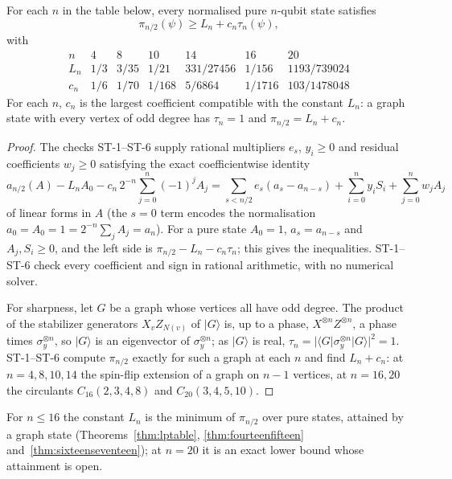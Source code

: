 \begin{theorem}
\label{thm:purity-spinflip-tradeoff}
For each $n$ in the table below, every normalised pure $n$-qubit state satisfies
\[
 \boxed{\qquad
 \pi_{n/2}(\psi)\ge L_n+c_n\tau_n(\psi),\qquad}
\]
with
\[
\begin{array}{c|cccccc}
n&4&8&10&14&16&20\\\hline
L_n&1/3&3/35&1/21&331/27456&1/156&1193/739024\\
c_n&1/6&1/70&1/168&5/6864&1/1716&103/1478048
\end{array}
\]
For each $n$, $c_n$ is the largest coefficient compatible with the constant $L_n$: a graph state with
every vertex of odd degree has $\tau_n=1$ and $\pi_{n/2}=L_n+c_n$.
\end{theorem}
\begin{proof}
The checks ST-1--ST-6 supply rational multipliers $e_s$,
$y_i\ge0$ and residual coefficients $w_j\ge0$ satisfying the exact coefficientwise identity
\begin{equation}\label{eq:tradeoff-dual}
 a_{n/2}(A)-L_nA_0-
 c_n\,2^{-n}\sum_{j=0}^n(-1)^jA_j
 =\sum_{s< n/2}e_s(a_s-a_{n-s})
  +\sum_{i=0}^n y_iS_i+\sum_{j=0}^n w_jA_j
\end{equation}
of linear forms in $A$ (the $s=0$ term encodes the normalisation $a_0=A_0=1=2^{-n}\sum_jA_j=a_n$).
For a pure state $A_0=1$, $a_s=a_{n-s}$ and $A_j,S_i\ge0$, and the left side is
$\pi_{n/2}-L_n-c_n\tau_n$; this gives the inequalities. ST-1--ST-6 check every coefficient and sign in
rational arithmetic, with no numerical solver.

For sharpness, let $G$ be a graph whose vertices all have odd degree. The product of the stabilizer
generators $X_vZ_{N(v)}$ of $|G\rangle$ is, up to a phase, $X^{\otimes n}Z^{\otimes n}$, a phase times
$\sigma_y^{\otimes n}$, so $|G\rangle$ is an eigenvector of $\sigma_y^{\otimes n}$; as $|G\rangle$ is
real, $\tau_n=|\langle G|\sigma_y^{\otimes n}|G\rangle|^2=1$. ST-1--ST-6 compute $\pi_{n/2}$ exactly
for such a graph at each $n$ and find $L_n+c_n$: at $n=4,8,10,14$ the spin-flip extension of a graph on
$n-1$ vertices, at $n=16,20$ the circulants $C_{16}(2,3,4,8)$ and
$C_{20}(3,4,5,10)$.
\end{proof}

For $n\le16$ the constant $L_n$ is the minimum of $\pi_{n/2}$ over pure states, attained by a graph
state (Theorems~\ref{thm:lptable}, \ref{thm:fourteenfifteen}
and~\ref{thm:sixteenseventeen}); at $n=20$ it is an exact
lower bound whose attainment is open.

